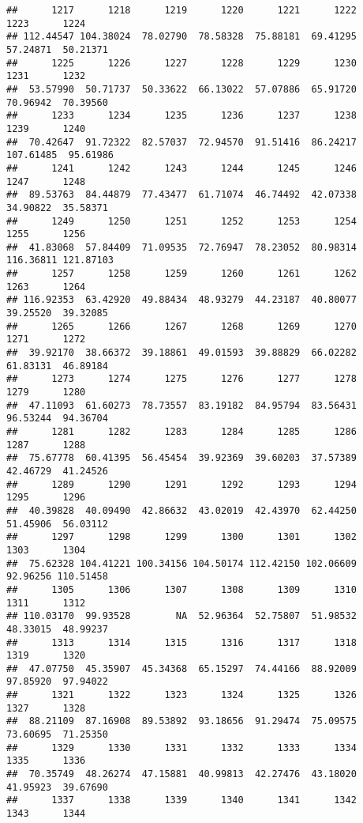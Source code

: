 \documentclass[
]{article}
\begin{document}
\begin{verbatim}
##      1217      1218      1219      1220      1221      1222      1223      1224 
## 112.44547 104.38024  78.02790  78.58328  75.88181  69.41295  57.24871  50.21371 
##      1225      1226      1227      1228      1229      1230      1231      1232 
##  53.57990  50.71737  50.33622  66.13022  57.07886  65.91720  70.96942  70.39560 
##      1233      1234      1235      1236      1237      1238      1239      1240 
##  70.42647  91.72322  82.57037  72.94570  91.51416  86.24217 107.61485  95.61986 
##      1241      1242      1243      1244      1245      1246      1247      1248 
##  89.53763  84.44879  77.43477  61.71074  46.74492  42.07338  34.90822  35.58371 
##      1249      1250      1251      1252      1253      1254      1255      1256 
##  41.83068  57.84409  71.09535  72.76947  78.23052  80.98314 116.36811 121.87103 
##      1257      1258      1259      1260      1261      1262      1263      1264 
## 116.92353  63.42920  49.88434  48.93279  44.23187  40.80077  39.25520  39.32085 
##      1265      1266      1267      1268      1269      1270      1271      1272 
##  39.92170  38.66372  39.18861  49.01593  39.88829  66.02282  61.83131  46.89184 
##      1273      1274      1275      1276      1277      1278      1279      1280 
##  47.11093  61.60273  78.73557  83.19182  84.95794  83.56431  96.53244  94.36704 
##      1281      1282      1283      1284      1285      1286      1287      1288 
##  75.67778  60.41395  56.45454  39.92369  39.60203  37.57389  42.46729  41.24526 
##      1289      1290      1291      1292      1293      1294      1295      1296 
##  40.39828  40.09490  42.86632  43.02019  42.43970  62.44250  51.45906  56.03112 
##      1297      1298      1299      1300      1301      1302      1303      1304 
##  75.62328 104.41221 100.34156 104.50174 112.42150 102.06609  92.96256 110.51458 
##      1305      1306      1307      1308      1309      1310      1311      1312 
## 110.03170  99.93528        NA  52.96364  52.75807  51.98532  48.33015  48.99237 
##      1313      1314      1315      1316      1317      1318      1319      1320 
##  47.07750  45.35907  45.34368  65.15297  74.44166  88.92009  97.85920  97.94022 
##      1321      1322      1323      1324      1325      1326      1327      1328 
##  88.21109  87.16908  89.53892  93.18656  91.29474  75.09575  73.60695  71.25350 
##      1329      1330      1331      1332      1333      1334      1335      1336 
##  70.35749  48.26274  47.15881  40.99813  42.27476  43.18020  41.95923  39.67690 
##      1337      1338      1339      1340      1341      1342      1343      1344 

\end{verbatim}
\end{document}
